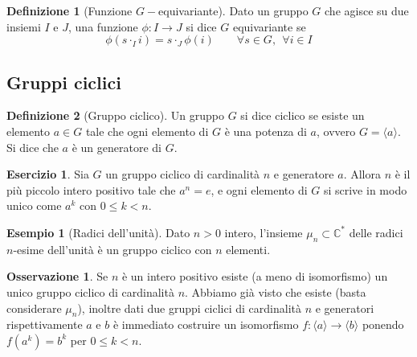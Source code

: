 \documentclass[11pt]{article}
\theoremstyle{plain}
\theoremstyle{definition}
\newtheorem{defn}{Definizione}[section]
\newtheorem{exmp}{Esempio}[section]
\newtheorem{exercise}{Esercizio}[section]
\newtheorem*{rem}{Osservazione}
\theoremstyle{remark}
\newcommand{\C}{\mathbb{C}}
\begin{document}
\begin{defn}[Funzione $G-$equivariante]
Dato un gruppo $G$ che agisce su due insiemi $I$ e $J$, una funzione $\phi: I \to J$ si dice $G$ equivariante se
\[ \phi(s \cdot_I i) = s \cdot_J \phi(i) \qquad \forall s \in G, \ \ \forall i \in I \]
\end{defn}





\newpage
\subsection{Gruppi ciclici}

\begin{defn}[Gruppo ciclico] Un gruppo $G$ si dice ciclico se esiste un elemento $a\in G$ tale che ogni
elemento di $G$ è una potenza di $a$, ovvero $G=\langle a\rangle$. Si dice che $a$ è un generatore di $G$.
\end{defn}

\begin{exercise}
Sia $G$ un gruppo ciclico di cardinalità $n$ e generatore $a$. Allora $n$ è il più piccolo intero positivo tale che $a^n = e$,
e ogni elemento di $G$ si scrive in modo unico come $a^k$ con $0\le k < n$.
\end{exercise}

\begin{exmp}[Radici dell'unità]
Dato $n>0$ intero, l'insieme $\mu_n\subset \C^*$ delle radici $n$-esime dell'unità è un gruppo ciclico con $n$ elementi.
\end{exmp}

\begin{rem} Se $n$ è un intero positivo esiste (a meno di isomorfismo) un unico gruppo ciclico di cardinalità $n$.
Abbiamo già visto che esiste (basta considerare $\mu_n$),
inoltre dati due gruppi ciclici di cardinalità $n$ e generatori rispettivamente $a$ e $b$ è immediato costruire un
isomorfismo $f:\langle a\rangle\to\langle b\rangle$ ponendo $f(a^k) = b^k$ per $0\le k < n$.
\end{rem}
\end{document}
